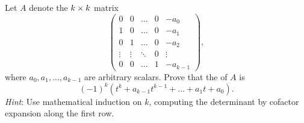\begin{exercise} \label{exercise 5.4.19}
Let \(A\) denote the \(k \times k\) matrix
\[
    \begin{pmatrix}
        0      & 0      & \dots  & 0 & -a_0 \\
        1      & 0      & \dots  & 0 & -a_1 \\
        0      & 1      & \dots  & 0 & -a_2 \\
        \vdots & \vdots & \ddots & 0 & \vdots \\
        0      & 0      & \dots  & 1 & -a_{k - 1}
    \end{pmatrix},
\]
where \(a_0, a_1, ..., a_{k - 1}\) are arbitrary scalars.
Prove that the \CPOLY{} of \(A\) is
\[
    (-1)^k (t^k + a_{k - 1} t^{k-1} + ... + a_1 t + a_0).
\]
\emph{Hint}: Use mathematical induction on \(k\), computing the determinant by cofactor expansion along the first row.
\end{exercise}

